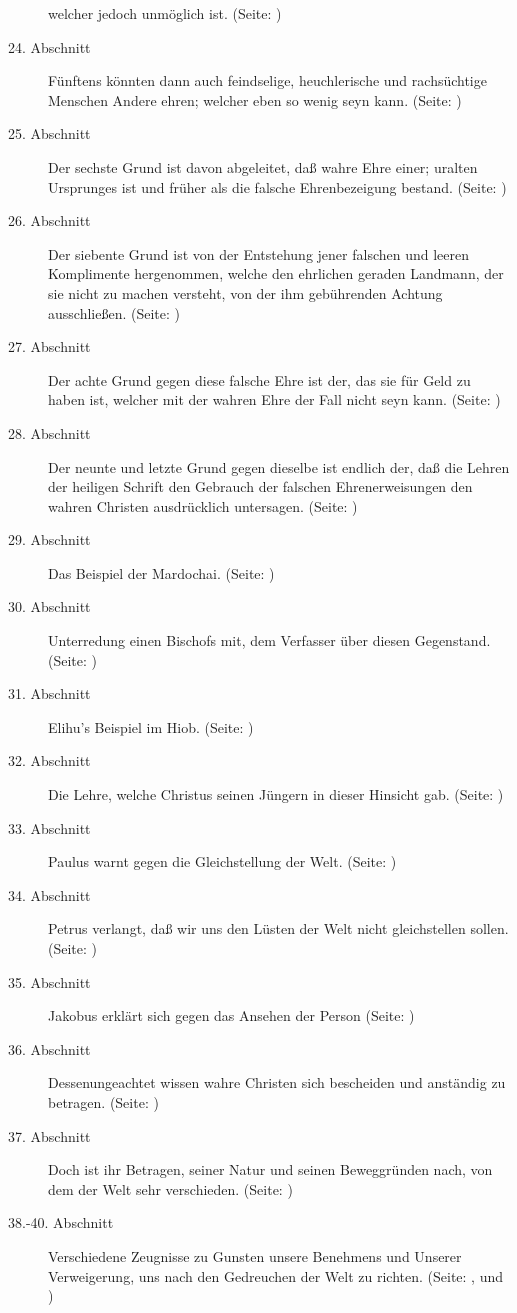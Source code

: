\begin{description}
welcher jedoch unmöglich ist. (Seite: \pageref{kap9_ab23})
\item[24. Abschnitt] Fünftens könnten dann auch feindselige, heuchlerische und
rachsüchtige Menschen Andere ehren; welcher eben so wenig seyn kann. (Seite: \pageref{kap9_ab24})
\item[25. Abschnitt] Der sechste Grund ist davon abgeleitet, daß wahre Ehre
einer; uralten Ursprunges ist und früher als die falsche Ehrenbezeigung bestand. (Seite: \pageref{kap9_ab25})
\item[26. Abschnitt] Der siebente Grund ist von der Entstehung jener falschen
und leeren Komplimente hergenommen, welche den ehrlichen geraden Landmann, der
sie nicht zu machen versteht, von der ihm gebührenden Achtung ausschließen. (Seite: \pageref{kap9_ab26})
\item[27. Abschnitt] Der achte Grund gegen diese falsche Ehre ist der, das sie
für Geld zu haben ist, welcher mit der wahren Ehre der Fall nicht seyn kann. (Seite: \pageref{kap9_ab27})
\item[28. Abschnitt] Der neunte und letzte Grund gegen dieselbe ist endlich der,
daß die Lehren der heiligen Schrift den Gebrauch der falschen Ehrenerweisungen
den wahren Christen ausdrücklich untersagen. (Seite: \pageref{kap9_ab28})
\item[29. Abschnitt] Das Beispiel der Mardochai. (Seite: \pageref{kap9_ab29})
\item[30. Abschnitt] Unterredung einen Bischofs mit, dem Verfasser über diesen
Gegenstand. (Seite: \pageref{kap9_ab30})
\item[31. Abschnitt] Elihu's Beispiel im Hiob. (Seite: \pageref{kap9_ab31})
\item[32. Abschnitt] Die Lehre, welche Christus seinen Jüngern in dieser
Hinsicht gab. (Seite: \pageref{kap9_ab32})
\item[33. Abschnitt] Paulus warnt gegen die Gleichstellung der Welt. (Seite: \pageref{kap9_ab33})
\item[34. Abschnitt] Petrus verlangt, daß wir uns den Lüsten der Welt nicht
gleichstellen sollen. (Seite: \pageref{kap9_ab34})
\item[35. Abschnitt] Jakobus erklärt sich gegen das Ansehen der Person (Seite: \pageref{kap9_ab35})
\item[36. Abschnitt] Dessenungeachtet wissen wahre Christen sich bescheiden und
anständig zu betragen. (Seite: \pageref{kap9_ab36})
\item[37. Abschnitt] Doch ist ihr Betragen, seiner Natur und seinen Beweggründen
nach, von dem der Welt sehr verschieden. (Seite: \pageref{kap9_ab37})
\item[38.-40. Abschnitt] Verschiedene Zeugnisse zu Gunsten unsere Benehmens und
Unserer Verweigerung, uns nach den Gedreuchen der Welt zu richten. (Seite: \pageref{kap9_ab38}, \pageref{kap9_ab39} und \pageref{kap9_ab40})

\end{description}
\normalsize

